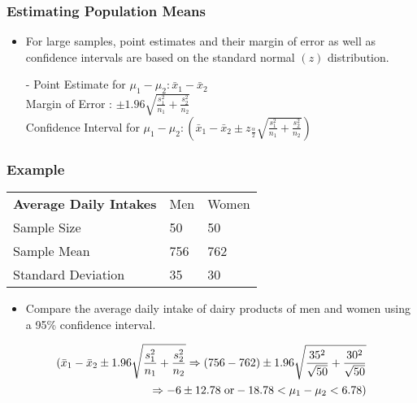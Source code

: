 \documentclass[12pt, letterpaper]{article}
\begin{document}
            \subsubsection{Estimating Population Means}
                \begin{itemize}
                    \item For large samples, point estimates and their margin of error as well as confidence intervals are based on the standard normal $(z)$ distribution.
                    \item[-] Point Estimate for $\mu_1-\mu_2 : \bar{x}_1-\bar{x}_2$ \\ Margin of Error : $\pm 1.96\sqrt{\frac{s^2_1}{n_1} + \frac{s^2_2}{n_2}}$ \\ Confidence Interval for $\mu_1-\mu_2 : (\bar{x}_1-\bar{x}_2\pm z_{\frac{\alpha}{2}}\sqrt{\frac{s^2_1}{n_1} + \frac{s^2_2}{n_2}})$
                \end{itemize}
            \subsubsection*{Example}
                \begin{tabular}{|l|l|l|}
                    \cline{1-3}
                    \textbf{Average Daily Intakes} & Men & Women \\ \cline{1-3}
                    Sample Size & 50 & 50 \\ \cline{1-3}
                    Sample Mean & 756 & 762 \\ \cline{1-3}
                    Standard Deviation & 35 & 30 \\ \cline{1-3}
                \end{tabular}
                \begin{itemize}
                    \item Compare the average daily intake of dairy products of men and women using a 95\% confidence interval.
                \end{itemize}
                \begin{mdframed}[leftmargin=0.5cm, rightmargin=0.5cm]
                    \begin{align*}
                        (\bar{x}_1 - \bar{x}_2\pm 1.96\sqrt{\frac{s^2_1}{n_1} + \frac{s^2_2}{n_2}} \Rightarrow (756 - 762)\pm 1.96\sqrt{\frac{35^2}{\sqrt{50}} + \frac{30^2}{\sqrt{50}}} \\ \Rightarrow -6\pm 12.78 \hspace{3pt} \textnormal{or} -18.78 < \mu_1 - \mu_2 < 6.78)
                    \end{align*}
                \end{mdframed}
\end{document}
